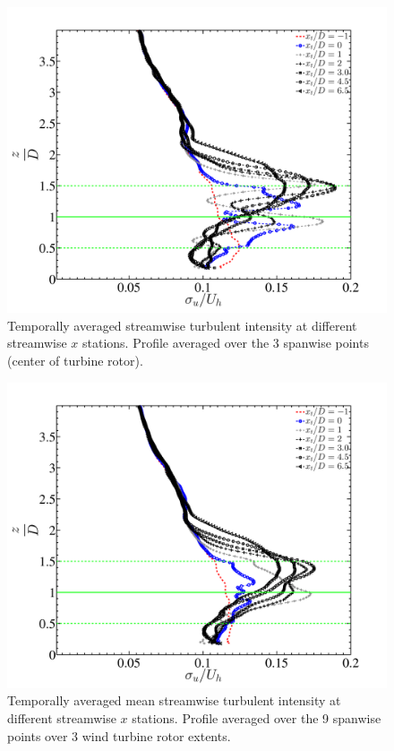 \begin{figure}
\centering
\includegraphics[width = 0.8\linewidth]{stats/ufluc_3points_avg.pdf}
\caption[Mean $\sigma_{u}$ at $x$ stations 1]{Temporally averaged streamwise turbulent intensity at different streamwise $x$ stations. Profile averaged over the  3 spanwise points (center of turbine rotor).}\label{fig:ustat1}
\end{figure}
\begin{figure}
\centering
\includegraphics[width = 0.8\linewidth]{stats/ufluc_9points_avg.pdf}
\caption[Mean $\sigma_{u}$ at $x$ stations 2]{Temporally averaged mean streamwise turbulent intensity at different streamwise $x$ stations. Profile averaged over the  9 spanwise points over 3 wind turbine rotor extents.}\label{fig:ustat2}
\end{figure}
